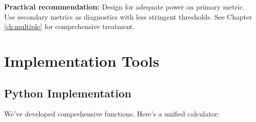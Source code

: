 \textbf{Practical recommendation:} Design for adequate power on primary metric. Use secondary metrics as diagnostics with less stringent thresholds. See Chapter \ref{ch:multiple} for comprehensive treatment.

\section{Implementation Tools}

\subsection{Python Implementation}

We've developed comprehensive functions. Here's a unified calculator:

\lstset{language=Python, caption=Comprehensive Sample Size Calculator, label=lst:comprehensive_calculator}
